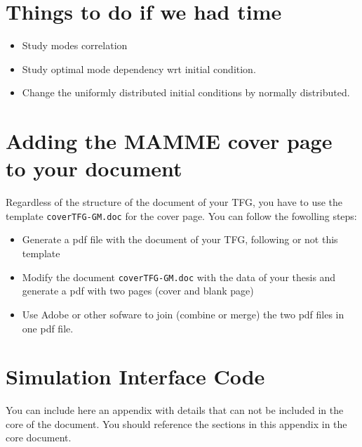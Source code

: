 \documentclass[12,twoside]{TFG-GM}
\theoremstyle{definition}
\theoremstyle{remark}
\begin{document}
\section{Things to do if we had time}
\label{sec:todo}
\begin{itemize}
\item Study modes correlation
\item Study optimal mode dependency wrt initial condition.
\item Change the uniformly distributed initial conditions by normally distributed.
\end{itemize}

\section{Adding the MAMME cover page to your document}
\label{sec:coverPage}
  
Regardless of the structure of the document of your TFG, you have to use the template \texttt{coverTFG-GM.doc} for the cover page. You can follow the fowolling steps:
\begin{itemize}
	\item Generate a pdf file with the document of your TFG, following or not this template
	\item Modify the document \texttt{coverTFG-GM.doc} with the data of your thesis and generate a pdf with two pages (cover and blank page)
	\item Use Adobe or other sofware to join (combine or merge) the two pdf files in one pdf file. 
\end{itemize}
 
\newpage

{}


\appendix
\vfill\newpage \section{Simulation Interface Code}
\label{app:code}
You can include here an appendix with details that can not be included in the core of the document. You should reference the sections in this appendix in the core document.
\end{document}
